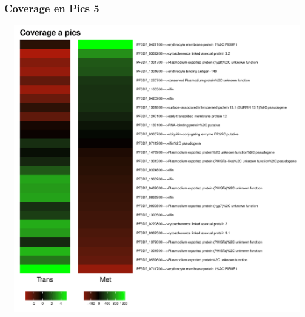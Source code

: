 \documentclass{article}\usepackage[]{graphicx}\usepackage[]{color}
\newenvironment{knitrout}{}{} %
\begin{document}
\subsubsection{Coverage en Pics 5}
\begin{knitrout}
\color{fgcolor}

{\centering \includegraphics[width=20cm,height=12.5cm]{figure/minimal-met_covapics_5-1} 

}



\end{knitrout}
\clearpage
\end{document}
